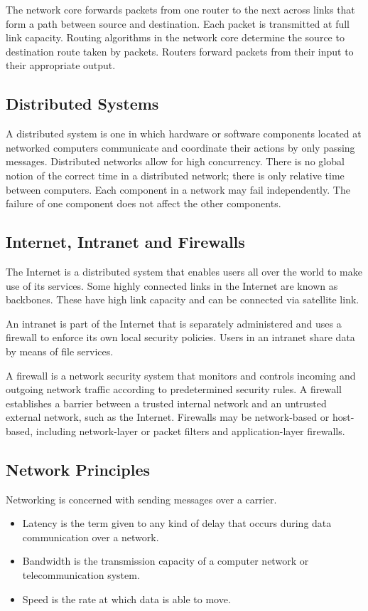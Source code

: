 The network core forwards packets from one router to the next across links that form a path between source and destination.
Each packet is transmitted at full link capacity.
Routing algorithms in the network core determine the source to destination route taken by packets.
Routers forward packets from their input to their appropriate output.

\subsection{Distributed Systems}

A distributed system is one in which hardware or software components located at networked computers communicate and coordinate their actions by only passing messages.
Distributed networks allow for high concurrency.
There is no global notion of the correct time in a distributed network; there is only relative time between computers.
Each component in a network may fail independently.
The failure of one component does not affect the other components.

\subsection{Internet, Intranet and Firewalls}

The Internet is a distributed system that enables users all over the world to make use of its services.
Some highly connected links in the Internet are known as backbones.
These have high link capacity and can be connected via satellite link.

An intranet is part of the Internet that is separately administered and uses a firewall to enforce its own local security policies.
Users in an intranet share data by means of file services.

A firewall is a network security system that monitors and controls incoming and outgoing network traffic according to predetermined security rules.
A firewall establishes a barrier between a trusted internal network and an untrusted external network, such as the Internet.
Firewalls may be network-based or host-based, including network-layer or packet filters and application-layer firewalls.

\subsection{Network Principles}

Networking is concerned with sending messages over a carrier.
\begin{itemize}
  \item Latency is the term given to any kind of delay that occurs during data communication over a network.
  \item Bandwidth is the transmission capacity of a computer network or telecommunication system.
  \item Speed is the rate at which data is able to move.
\end{itemize}

